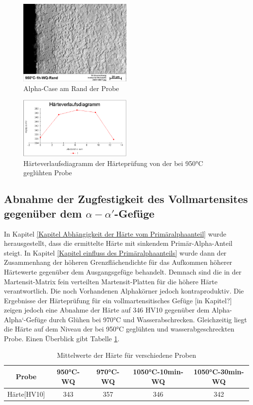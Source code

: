\documentclass[a4paper, 11pt]{tubsreprt}
\begin{document}
\begin{figure}
\centering
\includegraphics[width=0.5\textwidth]{Bilder/9501hwqrand.jpg}
\caption{Alpha-Case am Rand der Probe}
\label{alpha-case-950}
\end{figure}
\begin{figure}
\centering
\includegraphics[width=0.5\textwidth]{Bilder/Haerteverlaufsdiagramm.png}
\caption{Härteverlaufsdiagramm der Härteprüfung von der bei 950°C geglühten Probe}
\label{Härteverlaufsdiagramm 950C1hwq}
\end{figure}

\subsection{Abnahme der Zugfestigkeit des Vollmartensites gegenüber dem $\alpha-\alpha'$-Gefüge}
In Kapitel \ref{Kapitel Abhängigkeit der Härte vom Primäralphaanteil} wurde herausgestellt, dass die ermittelte Härte mit sinkendem Primär-Alpha-Anteil steigt. In Kapitel \ref{Kapitel einfluss des Primäralphaanteils} wurde dann der Zusammenhang der höheren Grenzflächendichte für das Aufkommen höherer Härtewerte gegenüber dem Ausgangsgefüge behandelt. Demnach sind die in der Martensit-Matrix fein verteilten Martensit-Platten für die höhere Härte verantwortlich. Die noch Vorhandenen Alphakörner jedoch kontraproduktiv.
Die Ergebnisse der Härteprüfung für ein vollmartensitisches Gefüge [in Kapitel?] zeigen jedoch eine Abnahme der Härte auf 346 HV10 gegenüber dem Alpha-Alpha`-Gefüge durch Glühen bei 970°C und Wasserabschrecken. Gleichzeitig liegt die Härte auf dem Niveau der bei 950°C geglühten und wasserabgeschreckten Probe. Einen Überblick gibt Tabelle \ref{Tabelle Mittelwerte Härte für verschiedene Proben}.
\begin{table}
\begin{tabular}{c|c|c|c|c}
Probe & 950°C-WQ & 970°C-WQ & 1050°C-10min-WQ & 1050°C-30min-WQ \\
\hline
Härte[HV10] & 343 & 357 & 346 & 342 \\
\end{tabular}
\caption{Mittelwerte der Härte für verschiedene Proben}
\label{Tabelle Mittelwerte Härte für verschiedene Proben}
\end{table}
\end{document}
